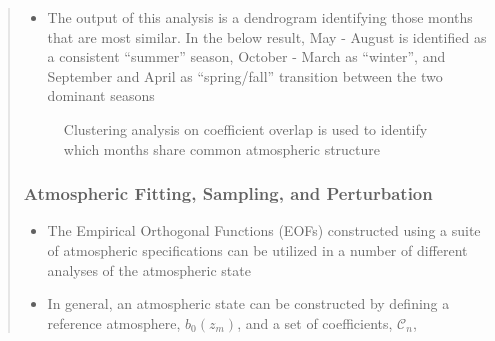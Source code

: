 \documentclass[letterpaper,10pt,english]{sphinxmanual}
\let\sphinxpxdimen\pdfpxdimen\else\newdimen\sphinxpxdimen
\begin{document}
\begin{itemize}
\begin{quote}
\begin{sphinxVerbatim}[commandchars=\\\{\}]
   
  
\end{sphinxVerbatim}
\begin{itemize}
\item {} 
The output of this analysis is a dendrogram identifying those months that are most similar.  In the below result, May - August is identified as a consistent “summer” season, October - March as “winter”, and September and April as “spring/fall” transition between the two dominant seasons

\end{itemize}

\begin{figure}[htbp]
\centering
\capstart

\noindent\sphinxincludegraphics[width=400\sphinxpxdimen]{{example_seasonality}.png}
\caption{Clustering analysis on coefficient overlap is used to identify which months share common atmospheric structure}\label{\detokenize{eofs:id2}}\end{figure}


\subsubsection{Atmospheric Fitting, Sampling, and Perturbation}
\label{\detokenize{sampling:atmospheric-fitting-sampling-and-perturbation}}\label{\detokenize{sampling:sampling}}\label{\detokenize{sampling::doc}}\begin{itemize}
\item {} 
The Empirical Orthogonal Functions (EOFs) constructed using a suite of atmospheric specifications can be utilized in a number of different analyses of the atmospheric state

\item {} 
In general, an atmospheric state can be constructed by defining a reference atmosphere, \(b_0 \left( z_m \right)\), and a set of coefficients, \(\mathcal{C}_n\),


\end{itemize}
\end{quote}
\end{itemize}
\end{document}
